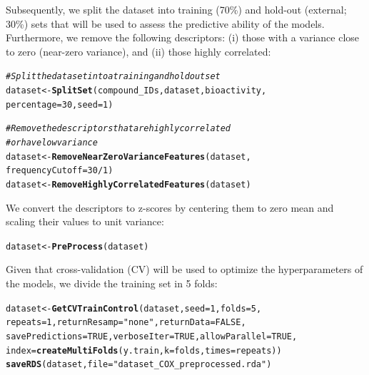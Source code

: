 \documentclass[twoside,a4wide,12pt]{article}\usepackage[]{graphicx}\usepackage[]{color}
\makeatletter
\newcommand{\hlnum}[1]{\textcolor[rgb]{0.686,0.059,0.569}{#1}}%
\newcommand{\hlstr}[1]{\textcolor[rgb]{0.192,0.494,0.8}{#1}}%
\newcommand{\hlcom}[1]{\textcolor[rgb]{0.678,0.584,0.686}{\textit{#1}}}%
\newcommand{\hlopt}[1]{\textcolor[rgb]{0,0,0}{#1}}%
\newcommand{\hlstd}[1]{\textcolor[rgb]{0.345,0.345,0.345}{#1}}%
\newcommand{\hlkwb}[1]{\textcolor[rgb]{0.69,0.353,0.396}{#1}}%
\newcommand{\hlkwc}[1]{\textcolor[rgb]{0.333,0.667,0.333}{#1}}%
\newcommand{\hlkwd}[1]{\textcolor[rgb]{0.737,0.353,0.396}{\textbf{#1}}}%
\newenvironment{kframe}{%
 \def\at@end@of@kframe{}%
 \ifinner\ifhmode%
  \def\at@end@of@kframe{\end{minipage}}%
  \begin{minipage}{\columnwidth}%
 \fi\fi%
 \def\FrameCommand##1{\hskip\@totalleftmargin \hskip-\fboxsep
 \colorbox{shadecolor}{##1}\hskip-\fboxsep
     \hskip-\linewidth \hskip-\@totalleftmargin \hskip\columnwidth}%
 \MakeFramed {\advance\hsize-\width
   \@totalleftmargin\z@ \linewidth\hsize
   \@setminipage}}%
 {\par\unskip\endMakeFramed%
 \at@end@of@kframe}
\newenvironment{knitrout}{}{} %
\makeatother
\begin{document}
Subsequently, we split the dataset into training (70\%) and hold-out (external; 30\%) sets that will be used to assess the predictive ability of the models. Furthermore, we remove the following descriptors: (i) those with a variance close to zero (near-zero variance), and (ii) those highly correlated:
\begin{knitrout}
\color{fgcolor}\begin{kframe}
\begin{alltt}
\hlcom{# Split the dataset into a training and holdout set}
\hlstd{dataset} \hlkwb{<-} \hlkwd{SplitSet}\hlstd{(compound_IDs, dataset, bioactivity,}
    \hlkwc{percentage} \hlstd{=} \hlnum{30}\hlstd{,} \hlkwc{seed} \hlstd{=} \hlnum{1}\hlstd{)}

\hlcom{# Remove the descriptors that are highly correlated}
\hlcom{# or have low variance}
\hlstd{dataset} \hlkwb{<-} \hlkwd{RemoveNearZeroVarianceFeatures}\hlstd{(dataset,}
    \hlkwc{frequencyCutoff} \hlstd{=} \hlnum{30}\hlopt{/}\hlnum{1}\hlstd{)}
\hlstd{dataset} \hlkwb{<-} \hlkwd{RemoveHighlyCorrelatedFeatures}\hlstd{(dataset)}
\end{alltt}
\end{kframe}
\end{knitrout}


We convert the descriptors to z-scores by centering them to zero mean and scaling their values to unit variance:
\begin{knitrout}
\color{fgcolor}\begin{kframe}
\begin{alltt}
\hlstd{dataset} \hlkwb{<-} \hlkwd{PreProcess}\hlstd{(dataset)}
\end{alltt}
\end{kframe}
\end{knitrout}


Given that cross-validation (CV) will be used to optimize the hyperparameters of the models, we divide the training set in 5 folds:
\begin{knitrout}
\color{fgcolor}\begin{kframe}
\begin{alltt}
\hlstd{dataset} \hlkwb{<-} \hlkwd{GetCVTrainControl}\hlstd{(dataset,} \hlkwc{seed} \hlstd{=} \hlnum{1}\hlstd{,} \hlkwc{folds} \hlstd{=} \hlnum{5}\hlstd{,}
    \hlkwc{repeats} \hlstd{=} \hlnum{1}\hlstd{,} \hlkwc{returnResamp} \hlstd{=} \hlstr{"none"}\hlstd{,} \hlkwc{returnData} \hlstd{=} \hlnum{FALSE}\hlstd{,}
    \hlkwc{savePredictions} \hlstd{=} \hlnum{TRUE}\hlstd{,} \hlkwc{verboseIter} \hlstd{=} \hlnum{TRUE}\hlstd{,} \hlkwc{allowParallel} \hlstd{=} \hlnum{TRUE}\hlstd{,}
    \hlkwc{index} \hlstd{=} \hlkwd{createMultiFolds}\hlstd{(y.train,} \hlkwc{k} \hlstd{= folds,} \hlkwc{times} \hlstd{= repeats))}
\hlkwd{saveRDS}\hlstd{(dataset,} \hlkwc{file} \hlstd{=} \hlstr{"dataset_COX_preprocessed.rda"}\hlstd{)}
\end{alltt}
\end{kframe}
\end{knitrout}
\end{document}
